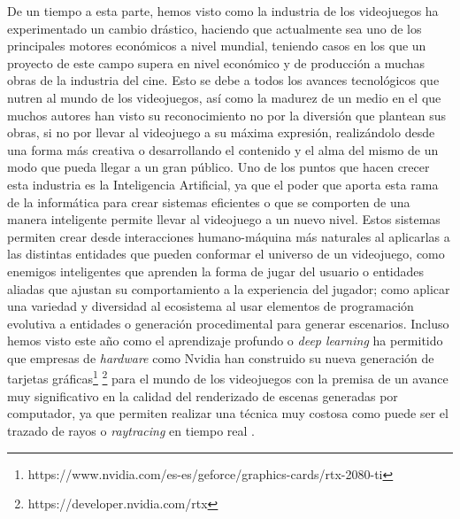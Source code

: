 De un tiempo a esta parte, hemos visto como la industria de los videojuegos ha experimentado un cambio drástico, haciendo que actualmente sea uno de los principales motores económicos a nivel mundial, teniendo casos en los que un proyecto de este campo supera en nivel económico y de producción a muchas obras de la industria del cine. Esto se debe a todos los avances tecnológicos que nutren al mundo de los videojuegos, así como la madurez de un medio en el que muchos autores han visto su reconocimiento no por la diversión que plantean sus obras, si no por llevar al videojuego a su máxima expresión, realizándolo desde una forma más creativa o desarrollando el contenido y el alma del mismo de un modo que pueda llegar a un gran público. Uno de los puntos que hacen crecer esta industria es la Inteligencia Artificial, ya que el poder que aporta esta rama de la informática para crear sistemas eficientes o que se comporten de una manera inteligente permite llevar al videojuego a un nuevo nivel. Estos sistemas permiten crear desde interacciones humano-máquina más naturales al aplicarlas a las distintas entidades que pueden conformar el universo de un videojuego, como enemigos inteligentes que aprenden la forma de jugar del usuario o entidades aliadas que ajustan su comportamiento a la experiencia del jugador; como aplicar una variedad y diversidad al ecosistema al usar elementos de programación evolutiva a entidades \cite{5286468} o generación procedimental \cite{parkin_2016} para generar escenarios. Incluso hemos visto este año como el aprendizaje profundo o \textit{deep learning} ha permitido que empresas de \textit{hardware} como Nvidia han construido su nueva generación de tarjetas gráficas\footnote{https://www.nvidia.com/es-es/geforce/graphics-cards/rtx-2080-ti} \footnote{https://developer.nvidia.com/rtx} para el mundo de los videojuegos con la premisa de un avance muy significativo en la calidad del renderizado de escenas generadas por computador, ya que permiten realizar una técnica muy costosa como puede ser el trazado de rayos o \textit{raytracing} \cite{Whitted:1980:IIM:358876.358882} en tiempo real \cite{Parker:2013:GRT:2447976.2447997}. \\

